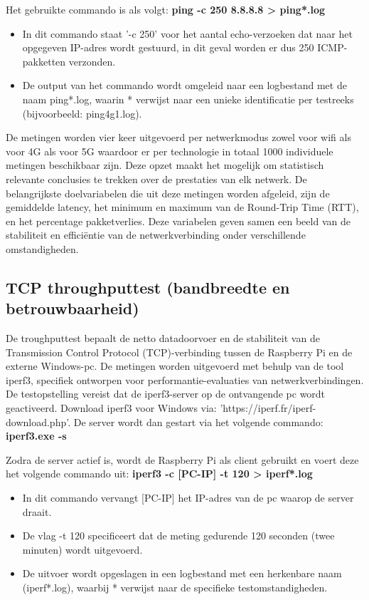 Het gebruikte commando is als volgt: \textbf{ping -c 250 8.8.8.8 > ping*.log}

\begin{itemize}
    \item In dit commando staat ’-c 250’ voor het aantal echo-verzoeken dat naar het opgegeven IP-adres wordt gestuurd, in dit geval worden er dus 250 ICMP-pakketten verzonden. 
    \item De output van het commando wordt omgeleid naar een logbestand met de naam ping*.log, waarin * verwijst naar een unieke identificatie per testreeks (bijvoorbeeld: ping4g1.log).
\end{itemize}


De metingen worden vier keer uitgevoerd per netwerkmodus zowel voor wifi als voor 4G als voor 5G waardoor er per technologie in totaal 1000 individuele metingen beschikbaar zijn. Deze opzet maakt het mogelijk om statistisch relevante conclusies te trekken over de prestaties van elk netwerk.
De belangrijkste doelvariabelen die uit deze metingen worden afgeleid, zijn de gemiddelde latency, het minimum en maximum van de Round-Trip Time (RTT), en het percentage pakketverlies. Deze variabelen geven samen een beeld van de stabiliteit en efficiëntie van de netwerkverbinding onder verschillende omstandigheden.


\subsection{TCP throughputtest (bandbreedte en betrouwbaarheid)}
De troughputtest bepaalt de netto datadoorvoer en de stabiliteit van de Transmission Control Protocol (TCP)-verbinding tussen de Raspberry Pi en de externe Windows-pc. De metingen worden uitgevoerd met behulp van de tool iperf3, specifiek ontworpen voor performantie-evaluaties van netwerkverbindingen. 
De testopstelling vereist dat de iperf3-server op de ontvangende pc wordt geactiveerd. Download iperf3 voor Windows via: ’https://iperf.fr/iperf-download.php’.
De server wordt dan gestart via het volgende commando: \textbf{iperf3.exe -s} 

Zodra de server actief is, wordt de Raspberry Pi als client gebruikt en voert deze het volgende commando uit: \textbf{iperf3 -c [PC-IP] -t 120 > iperf*.log}

\begin{itemize}
    \item In dit commando vervangt [PC-IP] het IP-adres van de pc waarop de server draait.
    \item De vlag -t 120 specificeert dat de meting gedurende 120 seconden (twee minuten) wordt uitgevoerd. 
    \item De uitvoer wordt opgeslagen in een logbestand met een herkenbare naam (iperf*.log), waarbij * verwijst naar de specifieke testomstandigheden.
\end{itemize}


